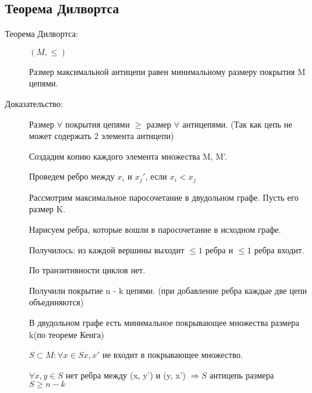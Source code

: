 \documentclass[12pt]{article}
\begin{document}
\subsection{Теорема Дилвортса}
\begin{description}
\item [Теорема Дилвортса:] 

$(M, \le)$

Размер максимальной антицепи равен минимальному размеру покрытия M цепями. 

\item[Доказательство:]

Размер $\forall$ покрытия цепями $\ge$ размер $\forall$ антицепями. (Так как цепь не может содержать 2 элемента антицепи)

Создадим копию каждого элемента множества M, M'.

Проведем ребро между $x_i$ и $x_j'$, если $x_i < x_j$

Рассмотрим максимальное паросочетание в двудольном графе. Пусть его размер K. 

Нарисуем ребра, которые вошли в паросочетание в исходном графе. 

Получилось: из каждой вершины выходит $\le 1$ ребра и $\le 1$ ребра входит. 

По транзитивности циклов нет. 

Получили покрытие n - k цепями. (при добавление ребра каждые две цепи объединяются)

В двудольном графе есть минимальное покрывающее множества размера k(по теореме Кенга)

$S \subset M: \forall x \in S x, x'$ не входит в покрывающее множество. 

$\forall x, y \in S$ нет ребра между (x, y') и (y, x') $\Rightarrow S$ антицепь размера $S \ge n - k$ 

\end{description}
\end{document}
